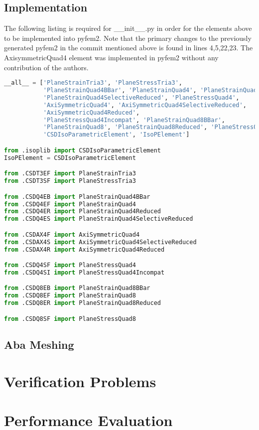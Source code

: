 \documentclass[10pt,letterpaper]{report}
\numberwithin{equation}{chapter}
\begin{document}
\section{Implementation}
The following listing is required for \_\_init\_\_.py in order for the elements above to be implemented into pyfem2. Note that the primary changes to the previously generated pyfem2 in the commit mentioned above is found in lines 4,5,22,23. The AxisymmetricQuad4 element was implemented in pyfem2 without any contribution of the authors.
\begin{lstlisting}[language=Python]
__all__ = ['PlaneStrainTria3', 'PlaneStressTria3',
           'PlaneStrainQuad4BBar', 'PlaneStrainQuad4', 'PlaneStrainQuad4Reduced',
           'PlaneStrainQuad4SelectiveReduced', 'PlaneStressQuad4',
           'AxiSymmetricQuad4', 'AxiSymmetricQuad4SelectiveReduced',
           'AxiSymmetricQuad4Reduced',
           'PlaneStressQuad4Incompat', 'PlaneStrainQuad8BBar',
           'PlaneStrainQuad8', 'PlaneStrainQuad8Reduced', 'PlaneStressQuad8',
           'CSDIsoParametricElement', 'IsoPElement']

from .isoplib import CSDIsoParametricElement
IsoPElement = CSDIsoParametricElement

from .CSDT3EF import PlaneStrainTria3
from .CSDT3SF import PlaneStressTria3

from .CSDQ4EB import PlaneStrainQuad4BBar
from .CSDQ4EF import PlaneStrainQuad4
from .CSDQ4ER import PlaneStrainQuad4Reduced
from .CSDQ4ES import PlaneStrainQuad4SelectiveReduced

from .CSDAX4F import AxiSymmetricQuad4
from .CSDAX4S import AxiSymmetricQuad4SelectiveReduced
from .CSDAX4R import AxiSymmetricQuad4Reduced

from .CSDQ4SF import PlaneStressQuad4
from .CSDQ4SI import PlaneStressQuad4Incompat

from .CSDQ8EB import PlaneStrainQuad8BBar
from .CSDQ8EF import PlaneStrainQuad8
from .CSDQ8ER import PlaneStrainQuad8Reduced

from .CSDQ8SF import PlaneStressQuad8
\end{lstlisting}

\section{Aba Meshing}





\chapter{Verification Problems}

\chapter{Performance Evaluation}
\end{document}
